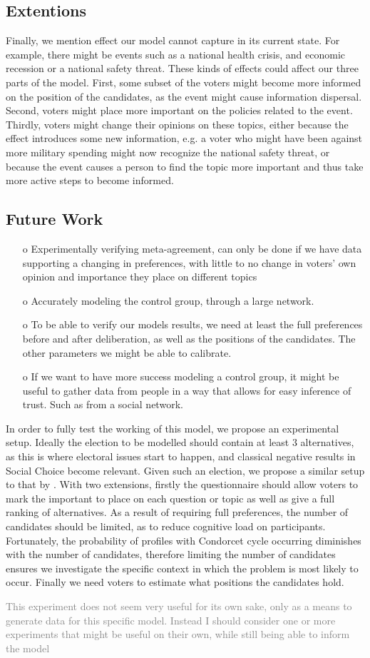 \subsection{Extentions}

Finally, we mention effect our model cannot capture in its current state. For
example, there might be events such as a national health crisis, and economic
recession or a national safety threat. These kinds of effects could affect our
three parts of the model. First, some subset of the voters might become more
informed on the position of the candidates, as the event might cause
information dispersal. Second, voters might place more important on the
policies related to the event. Thirdly, voters might change their opinions on
these topics, either because the effect introduces some new information, e.g. a
voter who might have been against more military spending might now recognize
the national safety threat, or because the event causes a person to find the
topic more important and thus take more active steps to become informed.

\subsection{Future Work}


\begin{itemize}
	\item [o] Experimentally verifying meta-agreement, can only be done if we have data supporting a changing in preferences, with little to no change in voters' own opinion and importance they place on different topics
	\item [o] Accurately modeling the control group, through a large network.
	\item[o] To be able to verify our models results, we need at least the full preferences before and after deliberation, as well as the positions of the candidates. The other parameters we might be able to calibrate.
	\item[o] If we want to have more success modeling a control group, it might be useful to gather data from people in a way that allows for easy inference of trust. Such as from a social network.
\end{itemize}


In order to fully test the working of this model, we propose an experimental
setup. Ideally the election to be modelled should contain at least 3
alternatives, as this is where electoral issues start to happen, and classical
negative results in Social Choice become relevant. Given such an election, we
propose a similar setup to that by \citet{fishkinCanDeliberationHave2024}. With
two extensions, firstly the questionnaire should allow voters to mark the
important to place on each question or topic as well as give a full ranking of
alternatives. As a result of requiring full preferences, the number of
candidates should be limited, as to reduce cognitive load on participants.
Fortunately, the probability of profiles with Condorcet cycle occurring
diminishes with the number of candidates, therefore limiting the number of
candidates ensures we investigate the specific context in which the problem is
most likely to occur. Finally we need voters to estimate what positions the candidates hold.

\textcolor{gray}{This experiment does not seem very useful for its own sake, only as a means to generate data for this specific model. Instead I should consider one or more experiments that might be useful on their own, while still being able to inform the model}
